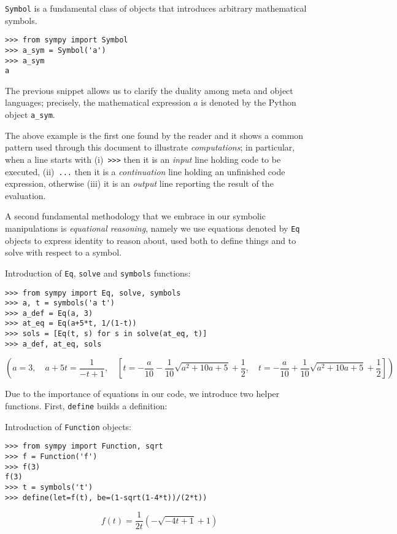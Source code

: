 \begin{example}
\verb|Symbol| is a fundamental class of objects that introduces arbitrary
mathematical symbols.
\begin{verbatim}
>>> from sympy import Symbol
>>> a_sym = Symbol('a')
>>> a_sym
a
\end{verbatim}
The previous snippet allows us to clarify the duality among meta and object
languages; precisely, the mathematical expression $a$ is denoted by the Python
object \verb|a_sym|.
\end{example}

The above example is the first one found by the reader and it shows a common
pattern used through this document to illustrate \textit{computations}; in
particular, when a line starts with (i)~\verb|>>>| then it is an \textit{input}
line holding code to be executed, (ii)~\verb|...| then it is a
\textit{continuation} line holding an unfinished code expression, otherwise
(iii) it is an \textit{output} line reporting the result of the evaluation.

A second fundamental methodology that we embrace in our symbolic manipulations is
\textit{equational reasoning}, namely we use equations denoted by \verb|Eq| objects
to express identity to reason about, used both to define things and
to solve with respect to a symbol.
\begin{example}
Introduction of \verb|Eq|, \verb|solve| and \verb|symbols| functions:
\begin{verbatim}
>>> from sympy import Eq, solve, symbols
>>> a, t = symbols('a t')
>>> a_def = Eq(a, 3)
>>> at_eq = Eq(a+5*t, 1/(1-t))
>>> sols = [Eq(t, s) for s in solve(at_eq, t)]
>>> a_def, at_eq, sols
\end{verbatim}
\begin{displaymath}
\left(
a=3,\quad a + 5 t = \frac{1}{- t + 1}, \quad \left [ t = - \frac{a}{10} - \frac{1}{10} \sqrt{a^{2} + 10 a + 5} + \frac{1}{2}, \quad t = - \frac{a}{10} + \frac{1}{10} \sqrt{a^{2} + 10 a + 5} + \frac{1}{2}\right ]
\right)
\end{displaymath}
\end{example}

Due to the importance of equations in our code, we introduce two
helper functions. First, \verb|define| builds a definition:


\begin{example}
Introduction of \verb|Function| objects:
\begin{verbatim}
>>> from sympy import Function, sqrt
>>> f = Function('f')
>>> f(3)
f(3)
>>> t = symbols('t')
>>> define(let=f(t), be=(1-sqrt(1-4*t))/(2*t))
\end{verbatim}
\begin{displaymath}
f{\left (t \right )} = \frac{1}{2 t} \left(- \sqrt{- 4 t + 1} + 1\right)
\end{displaymath}
\end{example}

